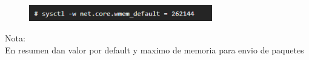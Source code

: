 \begin{itemize}
\begin{figure}[htb]
\begin{center}
\includegraphics[width=8cm]{./Imagenes/netcorewmendefault}
\end{center}
\end{figure}
\vspace*{0.10in}

Nota:
\\En resumen dan valor por default y maximo de memoria para envio de paquetes



\end{itemize} 
